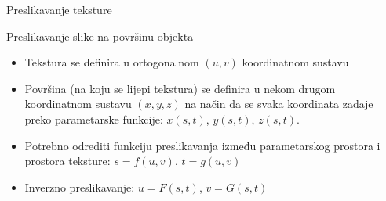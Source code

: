 \documentclass[9pt]{beamer}
\begin{document}
\begin{frame}{Preslikavanje teksture}
	\begin{block}{Preslikavanje slike na površinu objekta}
		\begin{itemize}
			\item Tekstura se definira u ortogonalnom $(u, v)$ koordinatnom sustavu
			\item Površina (na koju se lijepi tekstura) se definira u nekom drugom koordinatnom sustavu $(x,y,z)$ na način da se svaka koordinata zadaje preko parametarske funkcije:  $x(s,t)$, $y(s,t)$, $z(s,t)$.
			\item Potrebno odrediti funkciju preslikavanja između parametarskog prostora i prostora teksture: $s = f(u,v)$, $t = g(u,v)$
			\item Inverzno preslikavanje: $u = F(s,t)$, $v = G(s,t)$
		\end{itemize}		
	\end{block}	
\end{frame}
\end{document}

